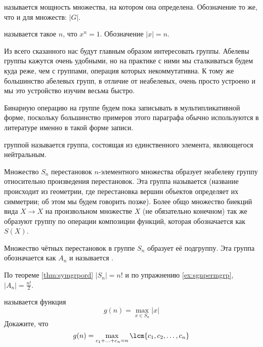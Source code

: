 \begin{definition}
	 называется мощность множества, на котором она определена. Обозначение то же, что и для множеств: $|G|$.
\end{definition}

\begin{definition}
	 называется такое $n$, что $x^n = 1$. Обозначение $|x| = n$.
\end{definition}

Из всего сказанного нас будут главным образом интересовать группы. Абелевы группы кажутся очень удобными, но на практике с ними мы сталкиваться будем куда реже, чем с группами, операция которых некоммутативна. К тому же большинство абелевых групп, в отличие от неабелевых, очень просто устроено и мы это устройство изучим весьма быстро.

Бинарную операцию на группе будем пока записывать в мультипликативной форме, поскольку большинство примеров этого параграфа обычно используются в литературе именно в такой форме записи.

\begin{example}
	 группой называется группа, состоящая из единственного элемента, являющегося нейтральным.
\end{example}

\begin{example}
	Множество $S_n$ перестановок $n$-элементного множества образует неабелеву группу относительно произведения перестановок. Эта группа называется  (название происходит из геометрии, где перестановка вершин объектов определяет их симметрии; об этом мы будем говорить позже). Более общо множество биекций вида $X\to X$ на произвольном множестве $X$ (не обязательно конечном) так же образуют группу по операции композиции функций, которая обозначается как $S(X)$.
\end{example}

\begin{example}
	Множество чётных перестановок в группе $S_n$ образует её подгруппу. Эта группа обозначается как $A_n$ и называется .
\end{example}

\begin{example}
	По теореме \ref{thm:symgrpord} $|S_n| = n!$ и по упражнению \ref{ex:sgnpermgrp}, $|A_n| = \frac{n!}{2}$.
\end{example}

\begin{exercise}
	 называется функция
	\[
	g(n) = \max_{x\in S_n} |x|
	\]
	Докажите, что
	\[
	g(n) = \max_{c_1+\ldots+c_n = n} \lcm\{c_1, c_2, \ldots, c_n\}
	\]
\end{exercise}

